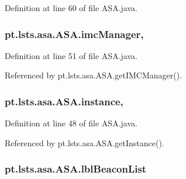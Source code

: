 Definition at line 60 of file A\+S\+A.\+java.

\hypertarget{classpt_1_1lsts_1_1asa_1_1ASA_a767130ab277b7f44d350625b5f1bcda3}{}
\subsubsection[{imc\+Manager}]{ pt.\+lsts.\+asa.\+A\+S\+A.\+imc\+Manager\hspace{0.3cm}{\ttfamily [static]}, {\ttfamily [private]}}\label{classpt_1_1lsts_1_1asa_1_1ASA_a767130ab277b7f44d350625b5f1bcda3}


Definition at line 51 of file A\+S\+A.\+java.



Referenced by pt.\+lsts.\+asa.\+A\+S\+A.\+get\+I\+M\+C\+Manager().

\hypertarget{classpt_1_1lsts_1_1asa_1_1ASA_aa2d7c4c00a6fe360e39facc220d35d23}{}
\subsubsection[{instance}]{ pt.\+lsts.\+asa.\+A\+S\+A.\+instance\hspace{0.3cm}{\ttfamily [static]}, {\ttfamily [private]}}\label{classpt_1_1lsts_1_1asa_1_1ASA_aa2d7c4c00a6fe360e39facc220d35d23}


Definition at line 48 of file A\+S\+A.\+java.



Referenced by pt.\+lsts.\+asa.\+A\+S\+A.\+get\+Instance().

\hypertarget{classpt_1_1lsts_1_1asa_1_1ASA_ae16acaf6a366616f9d7b7487666f030e}{}
\subsubsection[{lbl\+Beacon\+List}]{ pt.\+lsts.\+asa.\+A\+S\+A.\+lbl\+Beacon\+List\hspace{0.3cm}{\ttfamily [static]}}\label{classpt_1_1lsts_1_1asa_1_1ASA_ae16acaf6a366616f9d7b7487666f030e}


